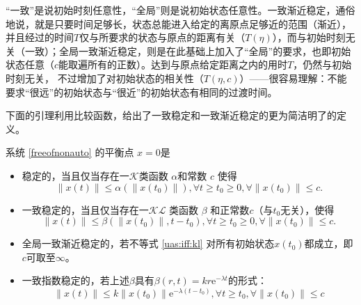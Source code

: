 \begin{note}
  “一致”是说初始时刻任意性，“全局”则是说初始状态任意性。一致渐近稳定，通俗地说，就是只要时间足够长，状态总能进入给定的离原点足够近的范围（渐近），
  并且经过的时间$T$仅与所要求的状态与原点的距离有关（$T(\eta)$），而与初始时刻无关（一致）；全局一致渐近稳定，则是在此基础上加入了“全局”的要求，也即初始状态任意（$c$能取遍所有的正数）。达到与原点给定距离之内的用时$T$，仍然与初始时刻无关，
  不过增加了对初始状态的相关性（$T(\eta,c)$）——很容易理解：不能要求“很远”的初始状态与“很近”的初始状态有相同的过渡时间。
\end{note}
下面的引理利用比较函数，给出了一致稳定和一致渐近稳定的更为简洁明了的定义。
\begin{lemma}
  系统 \eqref{freeofnonauto} 的平衡点 $x = 0$是
  \begin{itemize}[leftmargin=1em]
  \item 稳定的，当且仅当存在一$\mathcal{K}$类函数 $\alpha$和常数
  $c$ 使得
   \[ \| x (t) \| \leq \alpha (\| x (t_0) \|), \forall t \geq t_0 \geq 0,
       \forall \| x (t_0) \| \le c. \]
  \item 一致稳定的，当且仅当存在一$\mathcal{K}\mathcal{L}$ 类函数 $\beta$ 和正常数$c$（与$t_0$无关），使得
  \begin{equation}
    \| x (t) \| \leq \beta (\| x (t_0) \|, t - t_0), \forall t \geq t_0 \geq
    0, \forall \| x (t_0) \| \le  c \label{uas:iff:kl} .
  \end{equation}
  \item 全局一致渐近稳定的，若不等式 \eqref{uas:iff:kl} 对所有初始状态$x (t_0)$都成立，即$c$可取至$\infty$。
  \item 一致指数稳定的，若上述$\beta$具有$\beta(r,t)=kr\mathrm{e}^{-\lambda t}$的形式：
  \[\|x(t)\|\le k\|x(t_0)\|\mathrm{e}^{-\lambda(t-t_0)}, \forall t \geq t_0,\forall \| x (t_0) \| \le  c \]
  \end{itemize}
\end{lemma}

